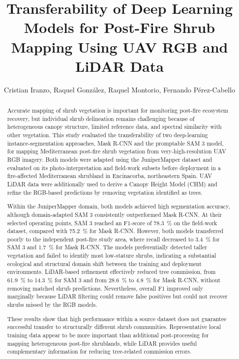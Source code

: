 \documentclass[12pt,a4paper]{article}
\title{
    Transferability of Deep Learning Models for Post-Fire Shrub Mapping Using UAV RGB and LiDAR Data
}
\author{
    Cristian Iranzo,
    Raquel González,
    Raquel Montorio,
    Fernando Pérez-Cabello
}
\date{}
\begin{document}
\maketitle

\linenumbers

\begin{abstract}
Accurate mapping of shrub vegetation is important for monitoring post-fire ecosystem recovery, but individual shrub delineation remains challenging because of heterogeneous canopy structure, limited reference data, and spectral similarity with other vegetation. This study evaluated the transferability of two deep-learning instance-segmentation approaches, Mask R-CNN and the promptable SAM 3 model, for mapping Mediterranean post-fire shrub vegetation from very-high-resolution UAV RGB imagery. Both models were adapted using the JuniperMapper dataset and evaluated on its photo-interpretation and field-work subsets before deployment in a fire-affected Mediterranean shrubland in Encinacorba, northeastern Spain. UAV LiDAR data were additionally used to derive a Canopy Height Model (CHM) and refine the RGB-based predictions by removing vegetation identified as trees.

Within the JuniperMapper domain, both models achieved high segmentation accuracy, although domain-adapted SAM 3 consistently outperformed Mask R-CNN. At their selected operating points, SAM 3 reached an F1-score of \qty{78.3}{\percent} on the field-work dataset, compared with \qty{75.2}{\percent} for Mask R-CNN. However, both models transferred poorly to the independent post-fire study area, where recall decreased to \qty{3.4}{\percent} for SAM 3 and \qty{1.7}{\percent} for Mask R-CNN. The models preferentially detected taller vegetation and failed to identify most low-stature shrubs, indicating a substantial ecological and structural domain shift between the training and deployment environments. LiDAR-based refinement effectively reduced tree commission, from \qty{61.9}{\percent} to \qty{14.3}{\percent} for SAM 3 and from \qty{28.6}{\percent} to \qty{4.8}{\percent} for Mask R-CNN, without removing matched shrub predictions. Nevertheless, overall F1 improved only marginally because LiDAR filtering could remove false positives but could not recover shrubs missed by the RGB models.

These results show that high performance within a source dataset does not guarantee successful transfer to structurally different shrub communities. Representative local training data appear to be more important than additional post-processing for mapping heterogeneous post-fire shrublands, while LiDAR provides useful complementary information for reducing tree-related commission errors.
\end{abstract}
\end{document}
